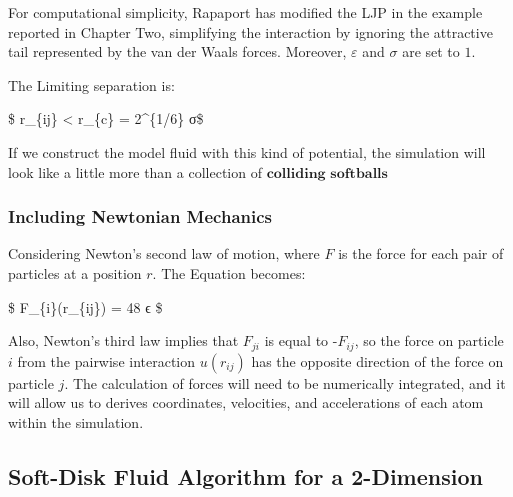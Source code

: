 \documentclass[11pt]{article}
\begin{document}
    For computational simplicity, Rapaport has modified the LJP in the
example reported in Chapter Two, simplifying the interaction by ignoring
the attractive tail represented by the van der Waals forces. Moreover,
\(ε\) and \(σ\) are set to \(1\).

The Limiting separation is:

\$ r\_\{ij\} \textless{} r\_\{c\} = 2\^{}\{1/6\} σ\$

If we construct the model fluid with this kind of potential, the
simulation will look like a little more than a collection of
\(\textbf{colliding softballs}\)

    \hypertarget{including-newtonian-mechanics}{%
\subsubsection{Including Newtonian
Mechanics}\label{including-newtonian-mechanics}}

Considering Newton's second law of motion, where \(F\) is the force for
each pair of particles at a position \(r\). The Equation becomes:

\$ F\_\{i\}(r\_\{ij\}) = 48 ϵ
\$

Also, Newton's third law implies that \(F_{ji}\) is equal to
-\(F_{ij}\), so the force on particle \(i\) from the pairwise
interaction \(u(r_{ij})\) has the opposite direction of the force on
particle \(j\). The calculation of forces will need to be numerically
integrated, and it will allow us to derives coordinates, velocities, and
accelerations of each atom within the simulation.

    \hypertarget{soft-disk-fluid-algorithm-for-a-2-dimension}{%
\subsection{Soft-Disk Fluid Algorithm for a
2-Dimension}\label{soft-disk-fluid-algorithm-for-a-2-dimension}}
\end{document}
